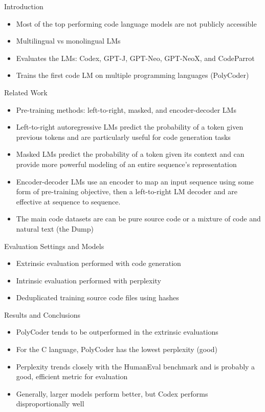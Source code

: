 \documentclass{article}
\begin{document}
Introduction
\begin{itemize}
\item Most of the top performing code language models are not publicly accessible
\item Multilingual vs monolingual LMs
\item Evaluates the LMs: Codex, GPT-J, GPT-Neo, GPT-NeoX, and CodeParrot
\item Trains the first code LM on multiple programming languages (PolyCoder)
\end{itemize}
Related Work
\begin{itemize}
\item Pre-training methods: left-to-right, masked, and encoder-decoder LMs
\item Left-to-right autoregressive LMs predict the probability of a token given previous tokens and are particularly useful for code generation tasks
\item Masked LMs predict the probability of a token given its context and can provide more powerful modeling of an entire sequence's representation
\item Encoder-decoder LMs use an encoder to map an input sequence using some form of pre-training objective, then a left-to-right LM decoder and are effective at sequence to sequence.
\item The main code datasets are can be pure source code or a mixture of code and natural text (the Dump)
\end{itemize}
Evaluation Settings and Models
\begin{itemize}
\item Extrinsic evaluation performed with code generation
\item Intrinsic evaluation performed with perplexity
\item Deduplicated training source code files using hashes
\end{itemize}
Results and Conclusions
\begin{itemize}
\item PolyCoder tends to be outperformed in the extrinsic evaluations
\item For the C language, PolyCoder has the lowest perplexity (good)
\item Perplexity trends closely with the HumanEval benchmark and is probably a good, efficient metric for evaluation
\item Generally, larger models perform better, but Codex performs disproportionally well
\end{itemize}
\end{document}
